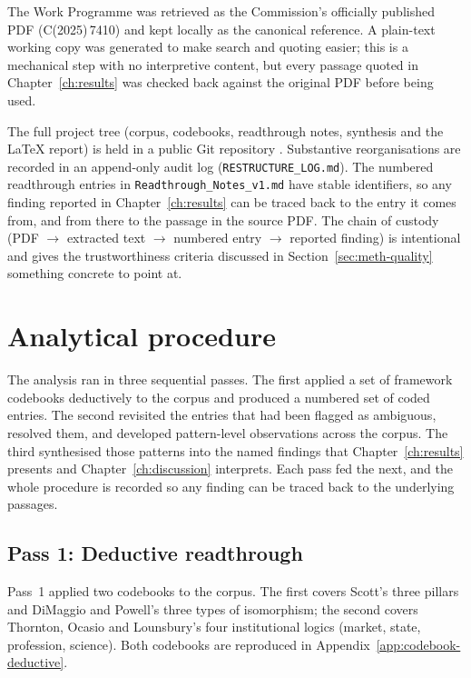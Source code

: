 The Work Programme was retrieved as the Commission's officially
published PDF (C(2025)\,7410) and kept locally as the canonical
reference. A plain-text working copy was generated to make search and
quoting easier; this is a mechanical step with no interpretive content,
but every passage quoted in Chapter~\ref{ch:results} was checked back
against the original PDF before being used.

The full project tree (corpus, codebooks, readthrough notes,
synthesis and the LaTeX report) is held in a public Git repository
\parencite{kirch2026thesisrepo}.
Substantive reorganisations are recorded in an append-only audit log
(\texttt{RESTRUCTURE\_LOG.md}). The numbered readthrough entries in
\texttt{Readthrough\_Notes\_v1.md} have stable identifiers, so any
finding reported in Chapter~\ref{ch:results} can be traced back to the
entry it comes from, and from there to the passage in the source PDF.
The chain of custody (PDF $\rightarrow$ extracted text $\rightarrow$
numbered entry $\rightarrow$ reported finding) is intentional and
gives the trustworthiness criteria discussed in
Section~\ref{sec:meth-quality} something concrete to point at.

\section{Analytical procedure}
\label{sec:meth-analysis}

The analysis ran in three sequential passes. The first applied a set of
framework codebooks deductively to the corpus and produced a numbered
set of coded entries. The second revisited the entries that had been
flagged as ambiguous, resolved them, and developed pattern-level
observations across the corpus. The third synthesised those patterns
into the named findings that Chapter~\ref{ch:results} presents and
Chapter~\ref{ch:discussion} interprets. Each pass fed the next, and the
whole procedure is recorded so any finding can be traced back to the
underlying passages.

\subsection{Pass 1: Deductive readthrough}
\label{sec:meth-pass1}

Pass~1 applied two codebooks to the corpus. The first covers Scott's
three pillars and DiMaggio and Powell's three types of isomorphism; the
second covers Thornton, Ocasio and Lounsbury's four institutional logics
(market, state, profession, science). Both codebooks are reproduced in
Appendix~\ref{app:codebook-deductive}.

